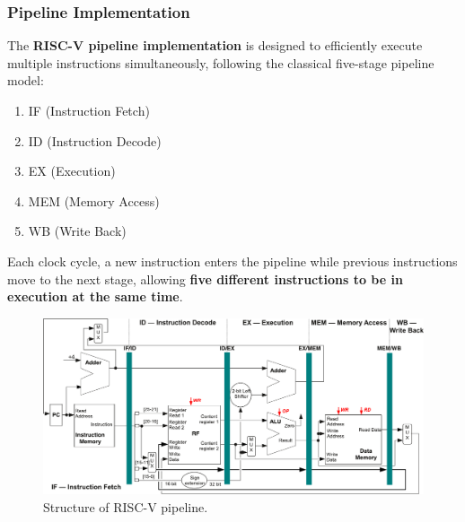 \subsubsection{Pipeline Implementation}

The \textbf{RISC-V pipeline implementation} is designed to efficiently execute multiple instructions simultaneously, following the classical five-stage pipeline model: 
\begin{enumerate}
    \item IF (Instruction Fetch)
    \item ID (Instruction Decode)
    \item EX (Execution)
    \item MEM (Memory Access)
    \item WB (Write Back)
\end{enumerate}
Each clock cycle, a new instruction enters the pipeline while previous instructions move to the next stage, allowing \textbf{five different instructions to be in execution at the same time}.

\begin{figure}[!htp]
    \centering
    \includegraphics[width=\textwidth]{img/risc-v-pipeline-structure-1.pdf}
    \caption{Structure of RISC-V pipeline.}
    \label{fig: structure of risc-v pipeline}
\end{figure}

